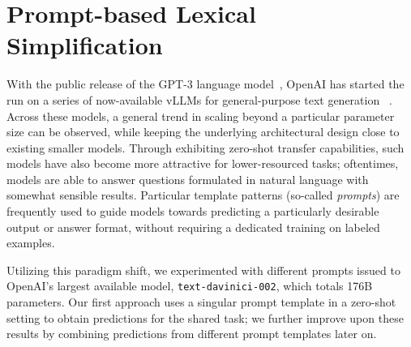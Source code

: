 \documentclass[11pt]{article}
\newcommand{\todo}[1]{\textcolor{red}{TODO: #1}}
\begin{document}
\section{Prompt-based Lexical Simplification}
With the public release of the GPT-3 language model~\cite{brown-etal-2020-language}, OpenAI has started the run on a series of now-available vLLMs for general-purpose text generation~ \cite{thoppilan-etal-2022-lambda,bigscience-2022-bloom,zhang-etal-2022-opt}. Across these models, a general trend in scaling beyond a particular parameter size can be observed, while keeping the underlying architectural design close to existing smaller models.
Through exhibiting zero-shot transfer capabilities, such models have also become more attractive for lower-resourced tasks; oftentimes, models are able to answer questions formulated in natural language with somewhat sensible results. Particular template patterns (so-called \emph{prompts}) are frequently used to guide models towards predicting a particularly desirable output or answer format, without requiring a dedicated training on labeled examples.

\noindent Utilizing this paradigm shift, we experimented with different prompts issued to OpenAI's largest available model, \texttt{text-davinici-002}, which totals 176B parameters.
Our first approach uses a singular prompt template in a zero-shot setting to obtain predictions for the shared task; we further improve upon these results by combining predictions from different prompt templates later on.
\end{document}
